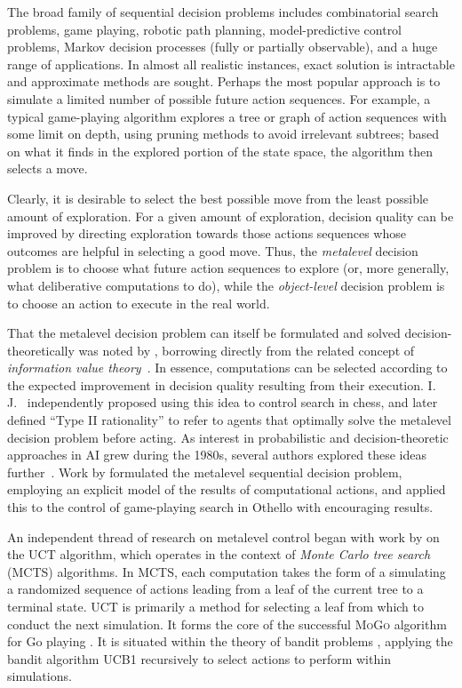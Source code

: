 The broad family of sequential decision problems includes
combinatorial search problems, game playing, robotic path planning,
model-predictive control problems, Markov decision processes (fully or
partially observable), and a huge range of applications. In almost all
realistic instances, exact solution is intractable and approximate
methods are sought.  Perhaps the most popular approach is to simulate
a limited number of possible future action sequences. For example,
a typical game-playing algorithm explores a tree or graph of action sequences
with some limit on depth, using pruning methods to avoid irrelevant
subtrees; based on what it finds in the explored portion of the state space, the algorithm
then selects a move.

Clearly, it is desirable to select the best possible move from the
least possible amount of exploration. For a given amount of
exploration, decision quality can be improved by directing exploration
towards those actions sequences whose outcomes are helpful in selecting
a good move. Thus, the {\em metalevel} decision problem is to choose
what future action sequences to explore (or, more generally, what
deliberative computations to do), while the {\em object-level}
decision problem is to choose an action to execute in the real world.

That the metalevel decision problem can itself be formulated and
solved decision-theoretically was noted by \citet{Matheson:1968},
borrowing directly from the related concept of {\em information value
  theory}~\citep{Howard:1966}. In essence, computations can be
selected according to the expected improvement in decision quality
resulting from their execution. I. J.~\citet{Good:1968} independently
proposed using this idea to control search in chess, and later defined
``Type II rationality'' to refer to agents that optimally solve the
metalevel decision problem before acting. As interest in probabilistic
and decision-theoretic approaches in AI grew during the 1980s, several
authors explored these ideas further~\citep{Dean+Boddy:1988,Doyle:1988,Fehling+Breese:1988,Horvitz:1987b}.
Work by
\citet{Russell+Wefald:1988a,Russell+Wefald:1991a,Russell+Wefald:1991b}
formulated the metalevel sequential decision problem, employing an
explicit model of the results of computational actions, and applied
this to the control of game-playing search in Othello with encouraging
results.

An independent thread of research on metalevel control began with work
by \citet{Kocsis+Szepesvari:2006} on the UCT algorithm, which operates
in the context of {\em Monte Carlo tree search} (MCTS) algorithms.
In MCTS, each computation takes the form
of a simulating a randomized sequence of actions leading from a leaf of the
current tree to a terminal state. UCT is primarily a method for
selecting a leaf from which to conduct the next simulation.
It forms the core of the successful \textsc{MoGo} algorithm for Go playing \citep{Gelly+Silver:2011}.  It is situated 
within the theory of bandit problems \citep{Berry+Fristedt:1985}, applying the bandit algorithm
UCB1 \citep{Auer+et+al:2002} recursively to select actions to perform within simulations.

